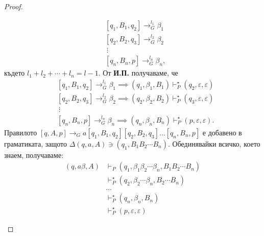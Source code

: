 \begin{proof}
\begin{description}
\begin{align*}
      & [q_1,B_1,q_{2}] \to^{l_1}_G \beta_1\\
      & [q_2,B_2,q_{3}] \to^{l_2}_G \beta_2\\
      & \ \vdots\\
      & [q_{n},B_n, p] \rightarrow^{l_n}_G \beta_n,
    \end{align*}
    където $l_1 + l_2 + \cdots + l_n = l-1$.
    От {\bf И.П.} получаваме, че 
    \begin{align*}
      & [q_1,B_1,q_{2}] \to^{l_1}_G \beta_1 \implies (q_1,\beta_1,B_1) \vdash^\star_P (q_{2},\varepsilon,\varepsilon) \\
      & [q_2,B_2,q_{3}] \to^{l_2}_G \beta_2 \implies (q_2,\beta_2,B_2) \vdash^\star_P (q_{3},\varepsilon,\varepsilon)\\
      & \ \vdots\\
      & [q_{n},B_n, p] \rightarrow^{l_n}_G \beta_n \implies  (q_{n},\beta_n,B_n) \vdash^\star_P (p,\varepsilon,\varepsilon).
    \end{align*}
    Правилото $[q,A,p] \rightarrow_G a[q_1,B_1,q_2][q_2,B_2,q_3]\dots[q_n,B_n,p]$ е добавено в граматиката, 
    защото $\Delta(q,a,A) \ni (q_1, B_1B_2\cdots B_n)$. 
    Обединявайки всичко, което знаем, получаваме:
    \begin{align*}
      (q, a\beta, A) & \vdash_P (q_1, \beta_1\beta_2\cdots\beta_n, B_1B_2\cdots B_n)\\
                     & \vdash^\star_P (q_2, \beta_{2}\cdots\beta_n, B_2\cdots B_n)\\
                     & \dots\\
                     & \vdash^\star_P (q_n, \beta_n, B_n)\\
                     & \vdash^\star_P (p, \varepsilon, \varepsilon)
    \end{align*}
  \end{description}
\end{proof}
  
